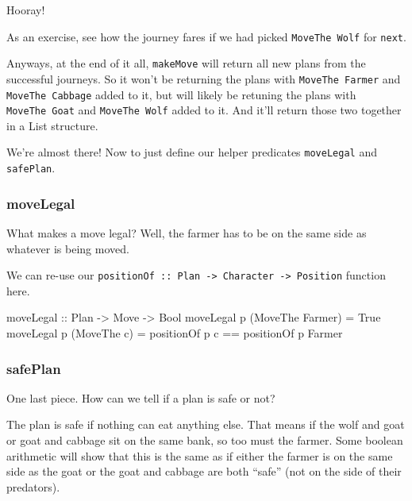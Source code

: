 \documentclass[]{article}
\newenvironment{Shaded}{}{}
\newcommand{\DataTypeTok}[1]{\textcolor[rgb]{0.56,0.13,0.00}{#1}}
\newcommand{\FunctionTok}[1]{\textcolor[rgb]{0.02,0.16,0.49}{#1}}
\newcommand{\NormalTok}[1]{#1}
\newcommand{\OtherTok}[1]{\textcolor[rgb]{0.00,0.44,0.13}{#1}}
\begin{document}
Hooray!

As an exercise, see how the journey fares if we had picked
\texttt{MoveThe\ Wolf} for \texttt{next}.

Anyways, at the end of it all, \texttt{makeMove} will return all new plans from
the successful journeys. So it won't be returning the plans with
\texttt{MoveThe\ Farmer} and \texttt{MoveThe\ Cabbage} added to it, but will
likely be retuning the plans with \texttt{MoveThe\ Goat} and
\texttt{MoveThe\ Wolf} added to it. And it'll return those two together in a
List structure.

We're almost there! Now to just define our helper predicates \texttt{moveLegal}
and \texttt{safePlan}.

\hypertarget{movelegal}{%
\subsubsection{moveLegal}\label{movelegal}}

What makes a move legal? Well, the farmer has to be on the same side as whatever
is being moved.

We can re-use our
\texttt{positionOf\ ::\ Plan\ -\textgreater{}\ Character\ -\textgreater{}\ Position}
function here.

\begin{Shaded}
\begin{Highlighting}[]
\OtherTok{moveLegal ::} \DataTypeTok{Plan} \OtherTok{->} \DataTypeTok{Move} \OtherTok{->} \DataTypeTok{Bool}
\NormalTok{moveLegal p (}\DataTypeTok{MoveThe} \DataTypeTok{Farmer}\NormalTok{)  }\FunctionTok{=} \DataTypeTok{True}
\NormalTok{moveLegal p (}\DataTypeTok{MoveThe}\NormalTok{ c)       }\FunctionTok{=}\NormalTok{ positionOf p c }\FunctionTok{==}\NormalTok{ positionOf p }\DataTypeTok{Farmer}
\end{Highlighting}
\end{Shaded}

\hypertarget{safeplan}{%
\subsubsection{safePlan}\label{safeplan}}

One last piece. How can we tell if a plan is safe or not?

The plan is safe if nothing can eat anything else. That means if the wolf and
goat or goat and cabbage sit on the same bank, so too must the farmer. Some
boolean arithmetic will show that this is the same as if either the farmer is on
the same side as the goat or the goat and cabbage are both ``safe'' (not on the
side of their predators).
\end{document}
